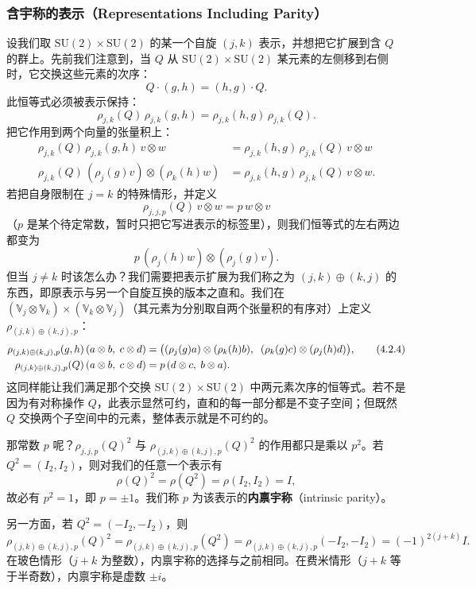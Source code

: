 \subsubsection{含宇称的表示（Representations Including Parity）}

设我们取 $\mathrm{SU}(2)\times\mathrm{SU}(2)$ 的某一个自旋 $(j,k)$ 表示，并想把它扩展到含 $Q$ 的群上。先前我们注意到，当 $Q$ 从 $\mathrm{SU}(2)\times\mathrm{SU}(2)$ 某元素的左侧移到右侧时，它交换这些元素的次序：
\[
Q\cdot(g,h)=(h,g)\cdot Q .
\]
此恒等式必须被表示保持：
\[
\rho_{j,k}(Q)\,\rho_{j,k}(g,h)=\rho_{j,k}(h,g)\,\rho_{j,k}(Q).
\]
把它作用到两个向量的张量积上：
\begin{align*}
\rho_{j,k}(Q)\,\rho_{j,k}(g,h)\,v\otimes w
&=\rho_{j,k}(h,g)\,\rho_{j,k}(Q)\,v\otimes w\\
\rho_{j,k}(Q)\,(\rho_j(g)v)\otimes(\rho_k(h)w)
&=\rho_{j,k}(h,g)\,\rho_{j,k}(Q)\,v\otimes w .
\end{align*}
若把自身限制在 $j=k$ 的特殊情形，并定义
\[
\rho_{j,j,p}(Q)\,v\otimes w=p\,w\otimes v
\]
（$p$ 是某个待定常数，暂时只把它写进表示的标签里），则我们恒等式的左右两边都变为
\[
p\,(\rho_j(h)w)\otimes(\rho_j(g)v).
\]
但当 $j\neq k$ 时该怎么办？我们需要把表示扩展为我们称之为 $(j,k)\oplus(k,j)$ 的东西，即原表示与另一个自旋互换的版本之直和。我们在 $(\mathbb{V}_j\otimes\mathbb{V}_k)\times(\mathbb{V}_k\otimes\mathbb{V}_j)$（其元素为分别取自两个张量积的有序对）上定义 $\rho_{(j,k)\oplus(k,j),p}$：
\begin{align}
\rho_{(j,k)\oplus(k,j),p}(g,h)\,(a\otimes b,\;c\otimes d)
&=\big((\rho_j(g)a)\otimes(\rho_k(h)b),\;\;(\rho_k(g)c)\otimes(\rho_j(h)d)\big), \tag{4.2.4}\\
\rho_{(j,k)\oplus(k,j),p}(Q)\,(a\otimes b,\;c\otimes d)
&=p\,(d\otimes c,\;b\otimes a). \notag
\end{align}
这同样能让我们满足那个交换 $\mathrm{SU}(2)\times\mathrm{SU}(2)$ 中两元素次序的恒等式。若不是因为有对称操作 $Q$，此表示显然可约，直和的每一部分都是不变子空间；但既然 $Q$ 交换两个子空间中的元素，整体表示就是不可约的。

那常数 $p$ 呢？$\rho_{j,j,p}(Q)^2$ 与 $\rho_{(j,k)\oplus(k,j),p}(Q)^2$ 的作用都只是乘以 $p^2$。若 $Q^2=(I_2,I_2)$，则对我们的任意一个表示有
\[
\rho(Q)^2=\rho(Q^2)=\rho(I_2,I_2)=I,
\]
故必有 $p^2=1$，即 $p=\pm1$。我们称 $p$ 为该表示的\textbf{内禀宇称}（intrinsic parity）。

另一方面，若 $Q^2=(-I_2,-I_2)$，则
\[
\rho_{(j,k)\oplus(k,j),p}(Q)^2=\rho_{(j,k)\oplus(k,j),p}(Q^2)
=\rho_{(j,k)\oplus(k,j),p}(-I_2,-I_2)=(-1)^{2(j+k)}I .
\]
在玻色情形（$j+k$ 为整数），内禀宇称的选择与之前相同。在费米情形（$j+k$ 等于半奇数），内禀宇称是虚数 $\pm i$。

